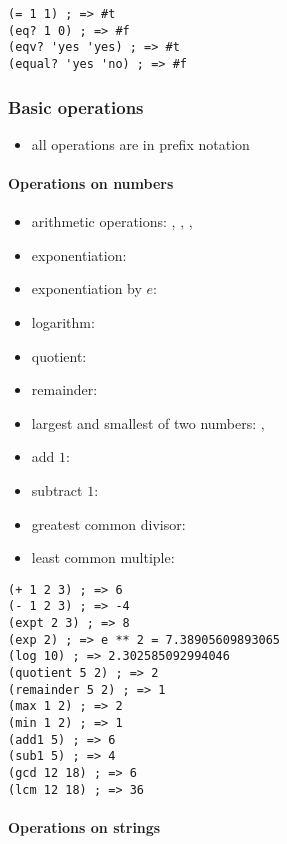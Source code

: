 \documentclass[a4paper,landscape,10pt]{article}
\begin{document}
\begin{multicols*}{2}
  \begin{lstlisting}[language=Racket]
(= 1 1) ; => #t
(eq? 1 0) ; => #f
(eqv? 'yes 'yes) ; => #t
(equal? 'yes 'no) ; => #f
\end{lstlisting}

  \subsubsection{Basic operations}

  \begin{itemize}
    \item all operations are in prefix notation 
  \end{itemize}

  \paragraph{Operations on numbers}

  \begin{itemize}
    \item arithmetic operations: \iracket{+}, \iracket{-}, \iracket{*}, \iracket{/}
    \item exponentiation: 
    \item exponentiation by \(e\): 
    \item logarithm: 
    \item quotient: 
    \item remainder: 
    \item largest and smallest of two numbers: , 
    \item add \(1\): 
    \item subtract \(1\): 
    \item greatest common divisor: 
    \item least common multiple: 
  \end{itemize}

  \begin{lstlisting}[language=Racket]
(+ 1 2 3) ; => 6
(- 1 2 3) ; => -4
(expt 2 3) ; => 8
(exp 2) ; => e ** 2 = 7.38905609893065
(log 10) ; => 2.302585092994046
(quotient 5 2) ; => 2
(remainder 5 2) ; => 1
(max 1 2) ; => 2
(min 1 2) ; => 1
(add1 5) ; => 6
(sub1 5) ; => 4
(gcd 12 18) ; => 6
(lcm 12 18) ; => 36
\end{lstlisting}

  \paragraph{Operations on strings}


\end{multicols*}
\end{document}
